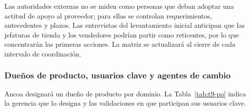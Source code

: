 \documentclass[11pt]{article}
\begin{document}
Las autoridades externas no se miden como personas que deban adoptar una actitud de apoyo al proveedor; para ellas se controlan requerimientos, antecedentes y plazos. Las entrevistas del levantamiento inicial anticipan que las jefaturas de tienda y los vendedores podrían partir como reticentes, por lo que concentrarán las primeras acciones. La matriz se actualizará al cierre de cada intervalo de coordinación.

\subsubsection{Dueños de producto, usuarios clave y agentes de cambio}\label{t9-4-po}

Ancoa designará un dueño de producto por dominio. La Tabla~\mbox{\ref{tab:t9-po}} indica la gerencia que lo designa y las validaciones en que participan sus usuarios clave.
\end{document}
